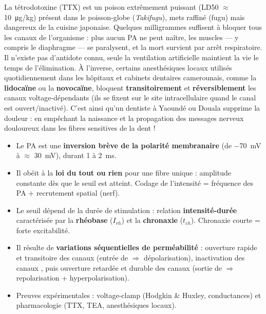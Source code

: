 \documentclass[11pt]{article}
\newcommand{\cle}[1]{{\popxbold\color{popdark}#1}}
\newcounter{popsec}
\newcounter{popsub}
\newcommand{\courssub}[1]{%
  \stepcounter{popsub}%
  \par\vspace{9pt}\noindent{\popxbold\fontsize{11.5}{13}\selectfont\color{popink}{\color{poporange}\thepopsec.\thepopsub}\hspace{6pt}#1}\par\nopagebreak\vspace{4pt}
}
\begin{document}
\begin{savaistu}
La \cle{tétrodotoxine} (TTX) est un poison extrêmement puissant (LD50 $\approx$ \SI{10}{\micro g/kg}) présent dans le poisson-globe (\emph{Takifugu}), mets raffiné (fugu) mais dangereux de la cuisine japonaise. Quelques milligrammes suffisent à bloquer tous les canaux  de l'organisme : plus aucun PA ne peut naître, les muscles — y compris le diaphragme — se paralysent, et la mort survient par arrêt respiratoire. Il n'existe pas d'antidote connu, seule la ventilation artificielle maintient la vie le temps de l'élimination.
À l'inverse, certains anesthésiques locaux utilisés quotidiennement dans les hôpitaux et cabinets dentaires camerounais, comme la \textbf{lidocaïne} ou la \textbf{novocaïne}, bloquent \textbf{transitoirement} et \textbf{réversiblement} les canaux  voltage-dépendants (ils se fixent sur le site intracellulaire quand le canal est ouvert/inactivé). C'est ainsi qu'un dentiste à Yaoundé ou Douala supprime la douleur : en empêchant la naissance et la propagation des messages nerveux douloureux dans les fibres sensitives de la dent !
\end{savaistu}

\courssub{Bilan et exercice d'application}

\begin{aretenir}
\begin{itemize}
\item Le PA est une \textbf{inversion brève de la polarité membranaire} (de \SI{-70}{mV} à $\approx$ \SI{+30}{mV}), durant 1 à \SI{2}{ms}.
\item Il obéit à la \textbf{loi du tout ou rien} pour une fibre unique : amplitude constante dès que le seuil est atteint. Codage de l'intensité = fréquence des PA + recrutement spatial (nerf).
\item Le seuil dépend de la durée de stimulation : relation \textbf{intensité-durée} caractérisée par la \textbf{rhéobase} ($I_{rh}$) et la \textbf{chronaxie} ($t_{ch}$). Chronaxie courte = forte excitabilité.
\item Il résulte de \textbf{variations séquentielles de perméabilité} : ouverture rapide et transitoire des canaux  (entrée de  $\Rightarrow$ dépolarisation), inactivation des canaux , puis ouverture retardée et durable des canaux  (sortie de  $\Rightarrow$ repolarisation + hyperpolarisation).
\item Preuves expérimentales : voltage-clamp (Hodgkin \& Huxley, conductances) et pharmacologie (TTX, TEA, anesthésiques locaux).
\end{itemize}
\end{aretenir}
\end{document}
